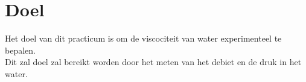 \section{Doel}

Het doel van dit practicum is om de viscociteit
van water experimenteel te bepalen.\\

Dit zal doel zal bereikt worden door het meten van het debiet
en de druk in het water.
